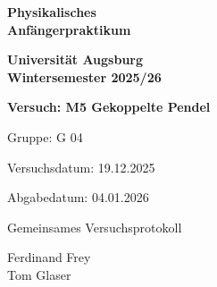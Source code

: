 \documentclass[
    toc=bibliographynumbered,
    a4paper,
    11pt,
    a4paper,
    11pt,
    twoside=false,]{article}
\newcommand{\Versuchnummer}{M5}                           %
\newcommand{\Versuch}{Gekoppelte Pendel}          %
\newcommand{\Abgabedatum}{04.01.2026}                           %
\newcommand{\Versuchsdatum}{19.12.2025}              %
\begin{document}
\begin{titlepage}
    
    {\color{teal!40!gray}\fontsize{50}{30}\selectfont\bfseries Physikalisches\\ Anfängerpraktikum}\\
    \vspace{0,5cm}
    {\LARGE {\textbf {Universität Augsburg\\Wintersemester 2025/26}}\par}
    \vspace{3cm}
    

   {\LARGE \textbf {Versuch: {}\Versuchnummer {} \Versuch  }}\\ 
   \vspace{1cm}



     \begin{minipage}{0.5\textwidth}

{\large Gruppe: \hfill G 04} %

\vspace{0.1cm}

{\large Versuchsdatum: \hfill \Versuchsdatum} %

\vspace{0.1cm}

{\large Abgabedatum: \hfill \Abgabedatum} %

\vspace{1.2cm}

{\large Gemeinsames Versuchsprotokoll}

\vspace{0.3cm}

{\large Ferdinand Frey\\Tom Glaser}

\end{minipage}


     




\vspace{2cm}
     \begin{minipage}{0.5\textwidth}
        \centering
    \end{minipage}\hfill
\end{titlepage}
\setcounter{page}{2}


\pagestyle{fancy}
\tableofcontents
\newpage

\pagestyle{fancy}

\newpage

\newpage

\newpage

\newpage

\newpage

\newpage

\end{document}
